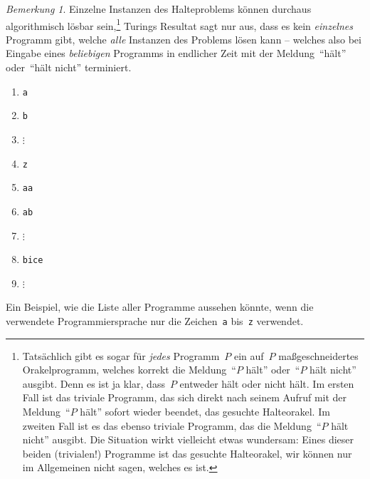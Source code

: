 \documentclass[twoside]{../zirkelblatt1415}
\theoremstyle{definition}
\theoremstyle{plain}
\theoremstyle{remark}
\newtheorem{bem}[defn]{Bemerkung}
\begin{document}
\begin{bem}Einzelne Instanzen des Halteproblems können durchaus algorithmisch
lösbar sein,\footnote{Tatsächlich gibt es sogar für \emph{jedes} Programm~$P$
ein auf~$P$ maßgeschneidertes Orakelprogramm, welches korrekt die Meldung~"`$P$
hält"' oder~"`$P$ hält nicht"' ausgibt. Denn es ist ja klar, dass~$P$ entweder
hält oder nicht hält.  Im ersten Fall ist das triviale Programm, das sich
direkt nach seinem Aufruf mit der Meldung~"`$P$ hält"' sofort wieder beendet,
das gesuchte Halteorakel. Im zweiten Fall ist es das ebenso triviale Programm,
das die Meldung~"`$P$ hält nicht"' ausgibt. Die Situation wirkt vielleicht
etwas wundersam: Eines dieser beiden (trivialen!) Programme ist das gesuchte
Halteorakel, wir können nur im Allgemeinen nicht sagen, welches es ist.}
Turings Resultat sagt nur aus, dass es kein \emph{einzelnes}
Programm gibt, welche \emph{alle} Instanzen des Problems lösen kann -- welches
also bei Eingabe eines \emph{beliebigen} Programms in endlicher Zeit mit der
Meldung~"`hält"' oder~"`hält nicht"' terminiert.\end{bem}

\begin{table}[t]
  \begin{enumerate}
    \item[1.] \texttt{a}
    \item[2.] \texttt{b}
    \item[] $\vdots$
    \item[26.] \texttt{z}
    \item[27.] \texttt{aa}
    \item[28.] \texttt{ab}
    \item[] $\vdots$
    \item[41320.] \texttt{bice}
    \item[] $\vdots$
  \end{enumerate}
  \centering
  \caption{\label{tafel:liste-aller-programme}Ein Beispiel, wie die Liste aller
  Programme aussehen könnte, wenn die verwendete Programmiersprache nur die
  Zeichen~\texttt{a} bis~\texttt{z} verwendet.}
\end{table}
\end{document}
